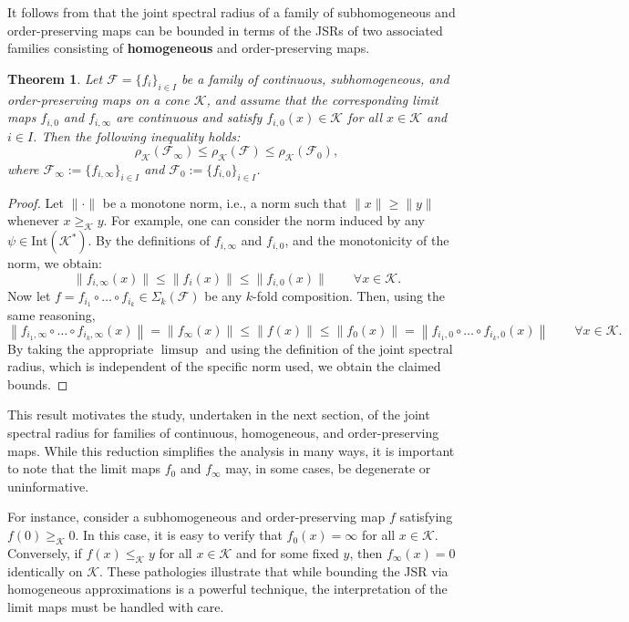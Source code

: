 \documentclass{article}
\newtheorem{theorem}{Theorem}[section]
\newcommand{\family}{\mathcal{F}}
\newcommand{\cradius}{\rho_{\cone}}
\newcommand{\cone}{\mathcal{K}}
\newcommand{\interior}{\mathrm{Int}}
\newcommand{\cgeq}{\geq_{\cone}}
\newcommand{\cleq}{\leq_{\cone}}
\begin{document}
It follows from  that the joint spectral radius of a family of subhomogeneous and order-preserving maps can be bounded in terms of the JSRs of two associated families consisting of \textbf{homogeneous} and order-preserving maps.

\begin{theorem}\label{Cor_controlling_JSR_of_subhomogeneous_by_homogeneous}
    Let $\family = \{f_i\}_{i \in I}$ be a family of continuous, subhomogeneous, and order-preserving maps on a cone $\cone$, and assume that the corresponding limit maps $f_{i,0}$ and $f_{i,\infty}$ are continuous and satisfy $f_{i,0}(x) \in \cone$ for all $x \in \cone$ and $i \in I$. Then the following inequality holds:
    \[
        \cradius(\family_{\infty}) \leq \cradius(\family) \leq \cradius(\family_0),
    \]
    where $\family_{\infty} := \{f_{i,\infty}\}_{i \in I}$ and $\family_0 := \{f_{i,0}\}_{i \in I}$.
\end{theorem}

\begin{proof}
Let $\|\cdot\|$ be a monotone norm, i.e., a norm such that $\|x\| \geq \|y\|$ whenever $x \cgeq y$. For example, one can consider the norm induced by any $\psi \in \interior(\cone^*)$. By the definitions of $f_{i,\infty}$ and $f_{i,0}$, and the monotonicity of the norm, we obtain:
\[
    \|f_{i,\infty}(x)\| \leq \|f_i(x)\| \leq \|f_{i,0}(x)\| \qquad \forall x \in \cone.
\]
Now let $f = f_{i_1} \circ \dots \circ f_{i_k} \in \Sigma_k(\family)$ be any $k$-fold composition. Then, using the same reasoning,
\[
    \left\|f_{i_1,\infty} \circ \dots \circ f_{i_k,\infty}(x)\right\|
    = \|f_{\infty}(x)\|
    \leq \|f(x)\|
    \leq \|f_0(x)\|
    = \left\|f_{i_1,0} \circ \dots \circ f_{i_k,0}(x)\right\| \qquad \forall x \in \cone.
\]
By taking the appropriate $\limsup$ and using the definition of the joint spectral radius, which is independent of the specific norm used, we obtain the claimed bounds.
\end{proof}

This result motivates the study, undertaken in the next section, of the joint spectral radius for families of continuous, homogeneous, and order-preserving maps. While this reduction simplifies the analysis in many ways, it is important to note that the limit maps $f_0$ and $f_{\infty}$ may, in some cases, be degenerate or uninformative.

For instance, consider a subhomogeneous and order-preserving map $f$ satisfying $f(0) \cgeq 0$. In this case, it is easy to verify that $f_0(x) = \infty$ for all $x \in \cone$. Conversely, if $f(x) \cleq y$ for all $x \in \cone$ and for some fixed $y$, then $f_{\infty}(x) = 0$ identically on $\cone$. These pathologies illustrate that while bounding the JSR via homogeneous approximations is a powerful technique, the interpretation of the limit maps must be handled with care.
\end{document}
